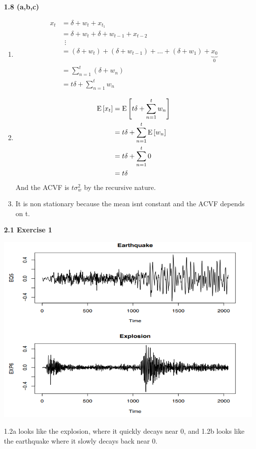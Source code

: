 \documentclass[12pt]{article}
\begin{document}
\newpage 
\textbf{1.8 (a,b,c)}
\begin{enumerate}[label=(\alph*)]
    \item \begin{align*}
        x_t &= \delta + w_t + x_{t_1}\\
        &= \delta+w_t + \delta + w_{t-1} + x_{t-2}\\
        &\;\,\vdots \\
        &= (\delta + w_t) + (\delta + w_{t-1}) + \dots + (\delta + w_1) + \underbrace{x_0}_{0}\\
        &= \sum_{n=1}^t (\delta + w_n) \\
        &= t \delta + \sum_{n=1}^t w_n
    \end{align*}
    \item \begin{align*}
        \Eb{x_t} &= \Eb{ t \delta + \sum_{n=1}^t w_n}\\
        &= t \delta +  \sum_{n=1}^t\Eb{ w_n} \\
        &= t \delta + \sum_{n=1}^t 0\\
        &= t \delta
    \end{align*}
    And the ACVF is $t \sigma_w^2$ by the recursive nature.
    \item It is non stationary because the mean isnt constant and the ACVF depends on t.
\end{enumerate}
\newpage
\textbf{2.1 Exercise 1}

\noindent \includegraphics[width=6in]{img/17.PNG}

\noindent 1.2a looks like the explosion, where it quickly decays near 0, and 1.2b looks like the earthquake where it slowly decays back near 0.
\end{document}
